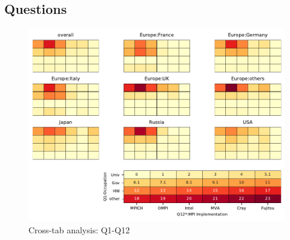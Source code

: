 
\subsection{Questions}


\begin{figure}
\begin{center}
\includegraphics[width=12cm]{../pdfs/Q1-Q12.pdf}
\caption{Cross-tab analysis: Q1-Q12}
\label{fig:Q1-Q12}
\end{center}
\end{figure}
